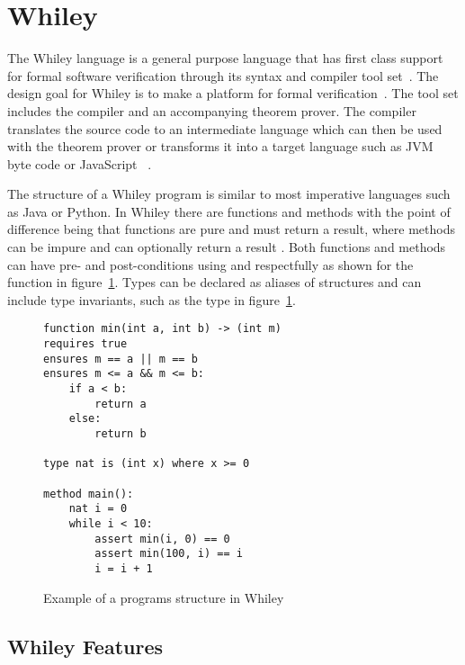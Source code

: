 \section{Whiley}

The Whiley language is a general purpose language that has first class
support for formal software verification through its syntax and compiler
tool set~\cite{whiley-origin}.
The design goal for Whiley is to make a platform for formal verification~\cite{whiley-origin}.
The tool set includes the compiler and an accompanying theorem prover.
The compiler translates the source code to an intermediate language which
can then be used with the theorem prover or transforms it into a target
language such as JVM byte code or JavaScript~\cite{whiley-design}
\cite{wyil}.

The structure of a Whiley program is similar to most imperative languages
such as Java or Python.
In Whiley there are functions and methods with the point of difference being
that functions are pure and must return a result,
where methods can be impure and can optionally return a result
\cite{whiley-spec}\cite{whiley-design}.
Both functions and methods can have pre- and post-conditions using
 and  respectfully as shown for the 
function in figure~\ref{lst:whiley-exp}.
Types can be declared as aliases of structures and can include type invariants,
such as the  type in figure~\ref{lst:whiley-exp}.

\begin{figure}[ht]
\begin{lstlisting}
function min(int a, int b) -> (int m)
requires true
ensures m == a || m == b
ensures m <= a && m <= b:
    if a < b:
        return a
    else:
        return b

type nat is (int x) where x >= 0

method main():
    nat i = 0
    while i < 10:
        assert min(i, 0) == 0
        assert min(100, i) == i
        i = i + 1
\end{lstlisting}
\caption{Example of a programs structure in Whiley}
\label{lst:whiley-exp}
\end{figure}

\subsection{Whiley Features}

